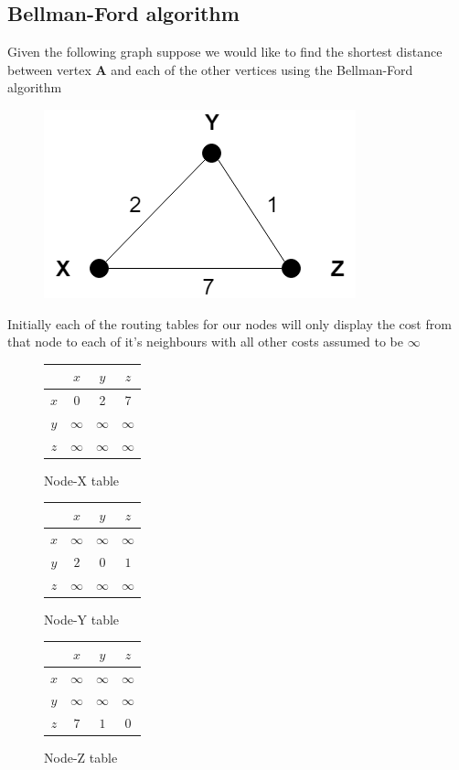 \documentclass{article}
\begin{document}
\subsection*{Bellman-Ford algorithm}
Given the following graph suppose we would like to find the shortest distance between vertex {\bf A} and each of the other vertices using the Bellman-Ford algorithm
\begin{figure}[H]
    \includegraphics[scale=0.5]{images/COMS_BF_alg.png}
    \centering
\end{figure}
Initially each of the routing tables for our nodes will only display the cost from that node to each of it's neighbours with all other costs assumed to be $\infty$
\begin{figure}[!htb]
   \begin{minipage}{0.3\textwidth}
    \centering
     \begin{tabular}{ c | ccc } 
        \, & $x$ & $y$ & $z$ \\
        \hline
        $x$ & 0 & 2 & 7 \\
        $y$ & $\infty$ & $\infty$ & $\infty$ \\
        $z$ & $\infty$ & $\infty$ & $\infty$ \\
    \end{tabular}
    \caption*{Node-X table}
   \end{minipage}
   \begin{minipage}{0.3\textwidth}
    \centering
     \begin{tabular}{ c | ccc } 
        \, & $x$ & $y$ & $z$ \\
        \hline
        $x$ & $\infty$ & $\infty$ & $\infty$ \\
        $y$ & $2$ & $0$ & $1$ \\
        $z$ & $\infty$ & $\infty$ & $\infty$ \\
    \end{tabular}
    \caption*{Node-Y table}
   \end{minipage}
   \begin{minipage}{0.3\textwidth}
    \centering
     \begin{tabular}{ c | ccc } 
        \, & $x$ & $y$ & $z$ \\
        \hline
        $x$ & $\infty$ & $\infty$ & $\infty$ \\
        $y$ & $\infty$ & $\infty$ & $\infty$ \\
        $z$ & $7$ & $1$ & $0$ \\
    \end{tabular}
    \caption*{Node-Z table}
   \end{minipage}
\end{figure}
\end{document}
